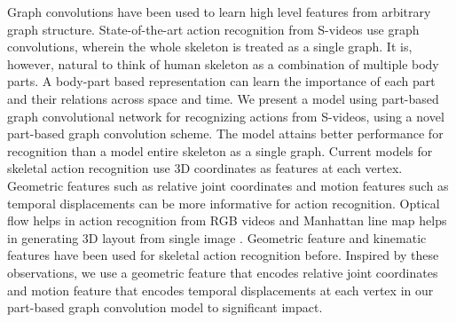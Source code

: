 \documentclass{bmvc2k}
\begin{document}
Graph convolutions \cite{niepert2016learning,defferrard2016convolutional,kipf2016semi} have been used to learn high level features from arbitrary graph structure. State-of-the-art action recognition from S-videos \cite{yan2018spatial,li2018spatio} use graph convolutions, wherein the whole skeleton is treated as a single graph. It is, however, natural to think of human skeleton as a combination of multiple body parts. A body-part based representation can learn the importance of each part and their relations across space and time. We present a model using part-based graph convolutional network for recognizing actions from S-videos, using a novel part-based graph convolution scheme. The model attains better performance for recognition than a model entire skeleton as a single graph. Current models for skeletal action recognition \cite{yan2018spatial,li2018spatio} use 3D coordinates as features at each vertex. Geometric features such as relative joint coordinates and motion features such as temporal displacements can be more informative for action recognition. Optical flow helps in action recognition from RGB videos \cite{wang2016temporal} and Manhattan line map helps in generating 3D layout from single image \cite{zou2018layoutnet}. Geometric feature \cite{zhang2017geometric} and kinematic features \cite{zanfir2013moving} have been used for skeletal action recognition before. Inspired by these observations, we use a geometric feature that encodes relative joint coordinates and motion feature that encodes temporal displacements at each vertex in our part-based graph convolution model to significant impact.
\end{document}
